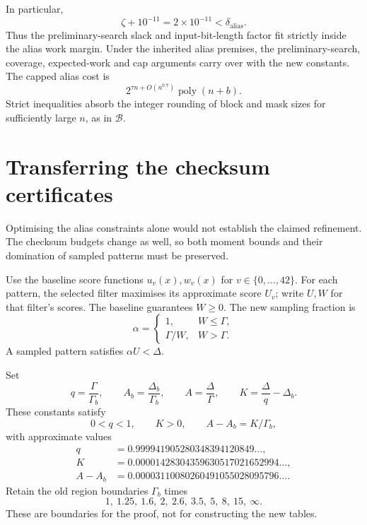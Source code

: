 \documentclass[11pt,a4paper]{article}
\theoremstyle{remark}
\newcommand{\Base}{\ensuremath{\mathcal{B}}}
\newcommand{\poly}{\operatorname{poly}}
\begin{document}
In particular,
\[
 \zeta+10^{-11}=2\times10^{-11}<\delta_{\mathrm{alias}}.
\]
Thus the preliminary-search slack and input-bit-length factor fit
strictly inside the alias work margin. Under the inherited alias
premises, the preliminary-search, coverage, expected-work and cap
arguments carry over with the new constants. The capped alias cost is
\begin{equation}
\label{eq:alias-time}
 2^{\tau n+O(n^{0.7})}\poly(n+b).
\end{equation}
Strict inequalities absorb the integer rounding of block and mask
sizes for sufficiently large $n$, as in \Base.

\section{Transferring the checksum certificates}
\label{sec:transfer}

Optimising the alias constraints alone would not establish the claimed
refinement. The checksum budgets change as well, so both moment bounds
and their domination of sampled patterns must be preserved.

Use the baseline score functions $u_v(x),w_v(x)$ for
$v\in\{0,\ldots,42\}$. For each pattern, the selected filter maximises
its approximate score $U_v$; write $U,W$ for that filter's scores.
The baseline guarantees $W\ge0$. The new sampling fraction is
\begin{equation}
\label{eq:alpha}
 \alpha=\begin{cases}
 1,&W\le\Gamma,\\
 \Gamma/W,&W>\Gamma.
 \end{cases}
\end{equation}
A sampled pattern satisfies $\alpha U<\Delta$.

Set
\begin{equation}
\label{eq:transfer-params}
 q=\frac{\Gamma}{\Gamma_b},\qquad
 A_b=\frac{\Delta_b}{\Gamma_b},\qquad
 A=\frac{\Delta}{\Gamma},\qquad
 K=\frac{\Delta}{q}-\Delta_b.
\end{equation}
These constants satisfy
\begin{equation}
\label{eq:transfer-identity}
 0<q<1,\qquad K>0,\qquad A-A_b=K/\Gamma_b,
\end{equation}
with approximate values
\begin{align*}
 q&=0.999941905280348394120849\ldots,\\
 K&=0.00001428304359630517021652994\ldots,\\
 A-A_b&=0.00003110080260491055028095796\ldots.
\end{align*}
Retain the old region boundaries $\Gamma_b$ times
\[
 1,\ 1.25,\ 1.6,\ 2,\ 2.6,\ 3.5,\ 5,\ 8,\ 15,\ \infty.
\]
These are boundaries for the proof, not for constructing the new tables.
\end{document}
